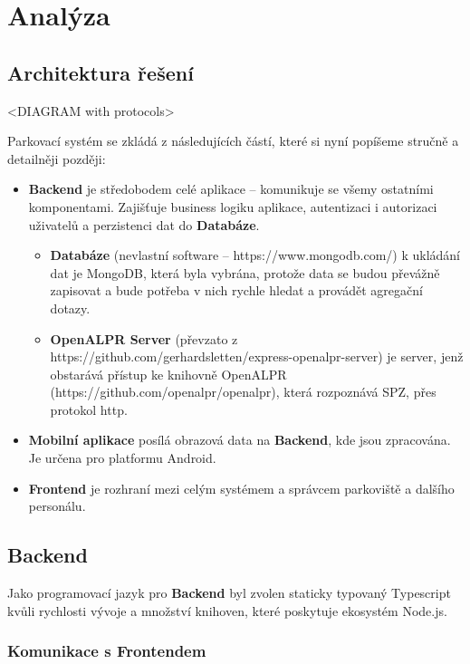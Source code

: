 
\chapter{Analýza} \label{analyza}

\section{Architektura řešení} \label{architektura_reseni}

<DIAGRAM with protocols>

Parkovací systém se zkládá z následujících částí, které si nyní popíšeme stručně a detailněji později:

\begin{itemize}
  \item \textbf{Backend} je středobodem celé aplikace -- komunikuje se všemy ostatními komponentami.
        Zajišťuje business logiku aplikace, autentizaci i autorizaci uživatelů a perzistenci dat do \textbf{Databáze}.
  \begin{itemize}
    \item \textbf{Databáze} (nevlastní software -- https://www.mongodb.com/) k ukládání dat je MongoDB, která byla vybrána, protože data se budou
          převážně zapisovat a bude potřeba v nich rychle hledat a provádět agregační dotazy.
    \item \textbf{OpenALPR Server} (převzato z https://github.com/gerhardsletten/express-openalpr-server) je server, jenž obstarává přístup
          ke knihovně OpenALPR (https://github.com/openalpr/openalpr), která rozpoznává SPZ, přes protokol http.
  \end{itemize}
  \item \textbf{Mobilní aplikace} posílá obrazová data na \textbf{Backend}, kde jsou zpracována. Je určena pro platformu Android.
  \item \textbf{Frontend} je rozhraní mezi celým systémem a správcem parkoviště a dalšího personálu.
\end{itemize}

\section{Backend} \label{backend}

Jako programovací jazyk pro \textbf{Backend} byl zvolen staticky typovaný Typescript kvůli rychlosti vývoje
a množství knihoven, které poskytuje ekosystém Node.js.

\subsection{Komunikace s Frontendem}

